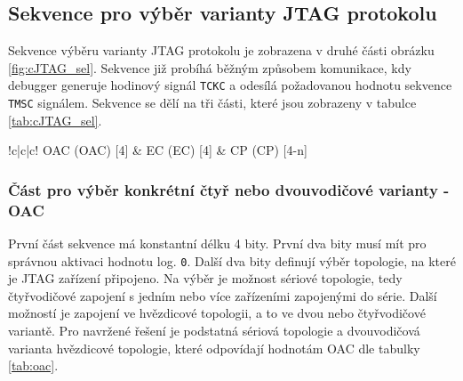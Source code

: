 
\subsection{Sekvence pro výběr varianty \acs{JTAG} protokolu}
Sekvence výběru varianty \acs{JTAG} protokolu je zobrazena v druhé části obrázku \ref{fig:cJTAG_sel}. Sekvence již probíhá běžným způsobem komunikace, kdy debugger generuje hodinový signál \texttt{\acs{TCKC}} a odesílá požadovanou hodnotu sekvence \texttt{\acs{TMSC}} signálem. Sekvence se dělí na tři části, které jsou zobrazeny v tabulce \ref{tab:cJTAG_sel}.

\begin{table}[!h]
  \caption{Formát sekvence pro výběr varianty \acs{JTAG} protokolu \cite{IEEE_1149-7}}
  \begin{center}
  	\small
	  \begin{tabular}{!{\vrule width 1.2pt}c|c|c!{\vrule width 1.2pt}}
				\acl{OAC} (\acs{OAC}) [4] & \acl{EC} (\acs{EC}) [4] & \acl{CP} (\acs{CP}) [4-n]\\
		\end{tabular}
  \end{center}
	\label{tab:cJTAG_sel}
\end{table}

\subsubsection{Část pro výběr konkrétní čtyř nebo dvouvodičové varianty - \acs{OAC}}
První část sekvence má konstantní délku 4 bity. První dva bity musí mít pro správnou aktivaci hodnotu log. \texttt{0}. Další dva bity definují výběr topologie, na které je \acs{JTAG} zařízení připojeno. Na výběr je možnost sériové topologie, tedy čtyřvodičové zapojení s jedním nebo více zařízeními zapojenými do série. Další možností je zapojení ve hvězdicové topologii, a to ve dvou nebo čtyřvodičové variantě. Pro navržené řešení je podstatná sériová topologie a dvouvodičová varianta hvězdicové topologie, které odpovídají hodnotám \acs{OAC} dle tabulky \ref{tab:oac}. \cite{IEEE_1149-7}

